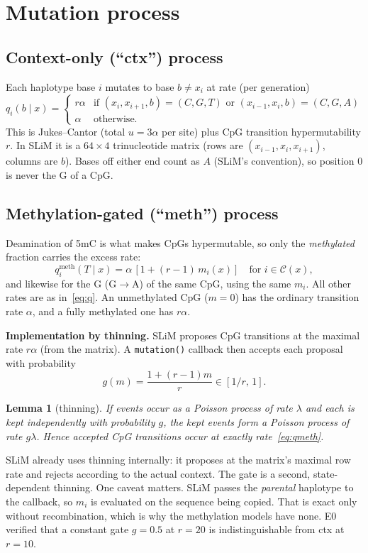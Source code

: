 \documentclass[11pt]{article}
\newtheorem{lemma}{Lemma}
\theoremstyle{definition}
\begin{document}
\section{Mutation process}\label{sec:mut}
\subsection{Context-only (``ctx'') process}
Each haplotype base $i$ mutates to base $b\neq x_i$ at rate (per generation)
\begin{equation}
q_i(b\mid x)=\begin{cases} r\alpha & \text{if } (x_i,x_{i+1},b)=(C,G,T) \text{ or } (x_{i-1},x_i,b)=(C,G,A)\\
\alpha & \text{otherwise.}\end{cases}
\label{eq:q}
\end{equation}
This is Jukes--Cantor (total $u=3\alpha$ per site) plus CpG transition hypermutability $r$. In SLiM it is a $64\times4$
trinucleotide matrix (rows are $(x_{i-1},x_i,x_{i+1})$, columns are $b$). Bases off either end count as $A$ (SLiM's
convention), so position $0$ is never the G of a CpG.

\subsection{Methylation-gated (``meth'') process}
Deamination of 5mC is what makes CpGs hypermutable, so only the \emph{methylated} fraction carries the excess rate:
\begin{equation}
q_i^{\text{meth}}(T\mid x)=\alpha\,[1+(r-1)\,m_i(x)] \quad\text{for } i\in\mathcal{C}(x),
\label{eq:qmeth}
\end{equation}
and likewise for the G (G$\to$A) of the same CpG, using the same $m_i$. All other rates are as in~\eqref{eq:q}. An
unmethylated CpG ($m=0$) has the ordinary transition rate $\alpha$, and a fully methylated one has $r\alpha$.

\textbf{Implementation by thinning.} SLiM proposes CpG transitions at the maximal rate $r\alpha$ (from the matrix). A
\texttt{mutation()} callback then accepts each proposal with probability
\begin{equation}
g(m)=\frac{1+(r-1)m}{r}\in[1/r,\,1].
\end{equation}
\begin{lemma}[thinning]
If events occur as a Poisson process of rate $\lambda$ and each is kept independently with probability $g$, the kept
events form a Poisson process of rate $g\lambda$. Hence accepted CpG transitions occur at exactly
rate~\eqref{eq:qmeth}.
\end{lemma}
SLiM already uses thinning internally: it proposes at the matrix's maximal row rate and rejects according to the actual
context. The gate is a second, state-dependent thinning. One caveat matters. SLiM passes the \emph{parental}
haplotype to the callback, so $m_i$ is evaluated on the sequence being copied. That is exact only without
recombination, which is why the methylation models have none. E0 verified that a constant gate $g=0.5$ at $r=20$ is
indistinguishable from ctx at $r=10$.
\end{document}
